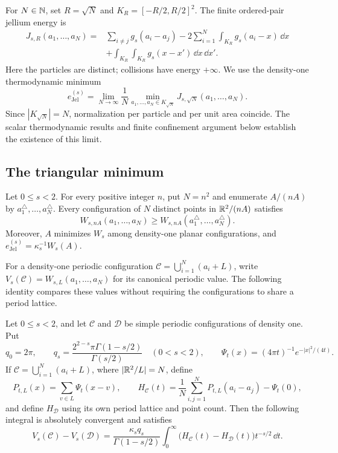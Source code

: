 For $N\in\mathbb N$, set $R=\sqrt N$ and $K_R=[-R/2,R/2]^2$.
The finite ordered-pair jellium energy is
\begin{equation}
\label{eq:finite-ordered-jellium}
\begin{split}
 J_{s,R}(a_1,\ldots,a_N)
 ={}&\sum_{i\ne j}g_s(a_i-a_j)
       -2\sum_{i=1}^N\int_{K_R}g_s(a_i-x)\,\dd x\\
    &+\int_{K_R}\int_{K_R}g_s(x-x')\,\dd x\,\dd x'.
\end{split}
\end{equation}
Here the particles are distinct; collisions have energy $+\infty$.
We use the density-one thermodynamic minimum
\[
 e_{\mathrm{Jel}}^{(s)}
 =\lim_{N\to\infty}\frac1N
       \min_{a_1,\ldots,a_N\in K_{\sqrt N}}
                    J_{s,\sqrt N}(a_1,\ldots,a_N).
\]
Since $|K_{\sqrt N}|=N$, normalization per particle and per unit area
coincide.  The scalar thermodynamic results and finite confinement
argument below establish the existence of this limit.

\subsection{The triangular minimum}

\begin{corollary}
\label{cor:riesz-jellium}
Let $0\le s<2$.  For every positive integer $n$, put $N=n^2$ and
enumerate $A/(nA)$ by $a_1^\triangle,\ldots,a_N^\triangle$.
Every configuration of $N$ distinct points in $\mathbb R^2/(nA)$ satisfies
\[
 W_{s,nA}(a_1,\ldots,a_N)
 \ge W_{s,nA}(a_1^\triangle,\ldots,a_N^\triangle).
\]
Moreover, $A$ minimizes $W_s$ among density-one planar configurations,
and $e_{\mathrm{Jel}}^{(s)}=\kappa_s^{-1}W_s(A)$.
\end{corollary}

For a density-one periodic configuration $\mathcal C=\bigcup_{i=1}^N(a_i+L)$,
write $V_s(\mathcal C)=W_{s,L}(a_1,\ldots,a_N)$ for its canonical
periodic value. The following identity compares these values without
requiring the configurations to share a period lattice.

\begin{lemma}
\label{lem:periodic-heat-comparison}
Let $0\le s<2$, and let $\mathcal C$ and $\mathcal D$ be simple periodic
configurations of density one. Put
\[
 q_0=2\pi,\qquad
 q_s=\frac{2^{2-s}\pi\Gamma(1-s/2)}{\Gamma(s/2)}\quad(0<s<2),
 \qquad \Psi_t(x)=(4\pi t)^{-1}e^{-|x|^2/(4t)}.
\]
If $\mathcal C=\bigcup_{i=1}^N(a_i+L)$, where $|\mathbb R^2/L|=N$, define
\[
 P_{t,L}(x)=\sum_{v\in L}\Psi_t(x-v),\qquad
 H_{\mathcal C}(t)=\frac1N\sum_{i,j=1}^N P_{t,L}(a_i-a_j)-\Psi_t(0),
\]
and define $H_{\mathcal D}$ using its own period lattice and point count.
Then the following integral is absolutely convergent and satisfies
\[
 V_s(\mathcal C)-V_s(\mathcal D)
 =\frac{\kappa_s q_s}{\Gamma(1-s/2)}\int_0^\infty
       \bigl(H_{\mathcal C}(t)-H_{\mathcal D}(t)\bigr)t^{-s/2}\,\dd t.
\]
\end{lemma}

